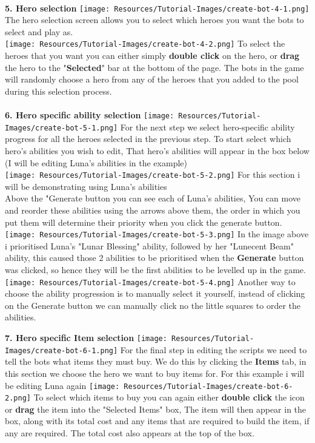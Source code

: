 \documentclass{article}
\begin{document}
\begin{flushleft}
\textbf{\\5. Hero selection}
\texttt{[image: Resources/Tutorial-Images/create-bot-4-1.png]}
The hero selection screen allows you to select which heroes you want the bots to select and play as.\\
\texttt{[image: Resources/Tutorial-Images/create-bot-4-2.png]}
To select the heroes that you want you can either simply \textbf{double click} on the hero, or \textbf{drag} the hero to the "\textbf{Selected}" bar at the bottom of the page. The bots in the game will randomly choose a hero from any of the heroes that you added to the pool during this selection process.\\

\textbf{\\6. Hero specific ability selection}
\texttt{[image: Resources/Tutorial-Images/create-bot-5-1.png]}
For the next step we select hero-specific ability progress for all the heroes selected in the previous step. To start select which hero's abilities you wish to edit, That hero's abilities will appear in the box below (I will be editing Luna's abilities in the example)\\
\texttt{[image: Resources/Tutorial-Images/create-bot-5-2.png]}
For this section i will be demonstrating using Luna's abilities\\
Above the "Generate button you can see each of Luna's abilities, You can move and reorder these abilities using the arrows above them, the order in which you put them will determine their priority when you click the generate button.
\texttt{[image: Resources/Tutorial-Images/create-bot-5-3.png]}
In the image above i prioritised Luna's "Lunar Blessing" ability, followed by her "Lunecent Beam" ability, this caused those 2 abilities to be prioritised when the \textbf{Generate} button was clicked, so hence they will be the first abilities to be levelled up in the game. 
\texttt{[image: Resources/Tutorial-Images/create-bot-5-4.png]}
Another way to choose the ability progression is to manually select it yourself, instead of clicking on the Generate button we can manually click no the little squares to order the abilities.

\textbf{7. Hero specific Item selection}
\texttt{[image: Resources/Tutorial-Images/create-bot-6-1.png]}
For the final step in editing the scripts we need to tell the bots what items they must buy. We do this by clicking the \textbf{Items} tab, in this section we choose the hero we want to buy items for. For this example i will be editing Luna again
\texttt{[image: Resources/Tutorial-Images/create-bot-6-2.png]}
To select which items to buy you can again either \textbf{double click} the icon or \textbf{drag} the item into the "Selected Items" box, The item will then appear in the box, along with its total cost and any items that are required to build the item, if any are required. The total cost also appears at the top of the box.


\end{flushleft}
\end{document}

